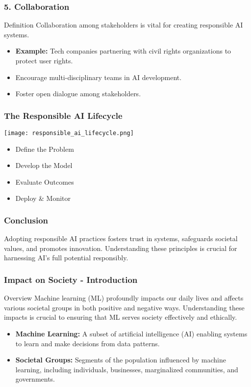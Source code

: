 \documentclass[aspectratio=169]{beamer}
\begin{document}
\begin{frame}[fragile]
    \frametitle{5. Collaboration}
    \begin{block}{Definition}
        Collaboration among stakeholders is vital for creating responsible AI systems.
    \end{block}
    \begin{itemize}
        \item \textbf{Example:} Tech companies partnering with civil rights organizations to protect user rights.
    \end{itemize}
    \begin{itemize}
        \item Encourage multi-disciplinary teams in AI development.
        \item Foster open dialogue among stakeholders.
    \end{itemize}
\end{frame}

\begin{frame}[fragile]
    \frametitle{The Responsible AI Lifecycle}
    \begin{block}{}
        \centering
        \texttt{[image: responsible\_ai\_lifecycle.png]}
    \end{block}
    \begin{itemize}
        \item Define the Problem
        \item Develop the Model
        \item Evaluate Outcomes
        \item Deploy \& Monitor
    \end{itemize}
\end{frame}

\begin{frame}[fragile]
    \frametitle{Conclusion}
    Adopting responsible AI practices fosters trust in systems, safeguards societal values, and promotes innovation. Understanding these principles is crucial for harnessing AI's full potential responsibly.
\end{frame}

\begin{frame}[fragile]
    \frametitle{Impact on Society - Introduction}
    \begin{block}{Overview}
        Machine learning (ML) profoundly impacts our daily lives and affects various societal groups in both positive and negative ways. 
        Understanding these impacts is crucial to ensuring that ML serves society effectively and ethically.
    \end{block}
    \begin{itemize}
        \item \textbf{Machine Learning:} A subset of artificial intelligence (AI) enabling systems to learn and make decisions from data patterns.
        \item \textbf{Societal Groups:} Segments of the population influenced by machine learning, including individuals, businesses, marginalized communities, and governments.
    \end{itemize}
\end{frame}
\end{document}
